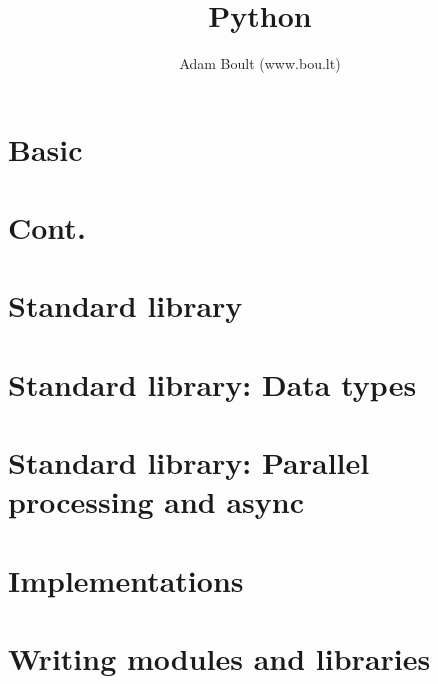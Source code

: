 \documentclass[oneside]{book}
\begin{document}
\author{Adam Boult (www.bou.lt)}
\title{Python}
\maketitle

\setcounter{tocdepth}{0}
\tableofcontents



\part{Basic}









\part{Cont.}





\part{Standard library}










\part{Standard library: Data types}


\part{Standard library: Parallel processing and async}


\part{Implementations}


\part{Writing modules and libraries}



\end{document}
